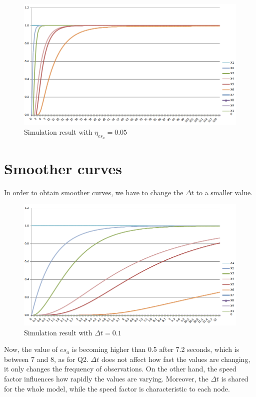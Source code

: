 \documentclass[a4paper]{article}
\begin{document}
\begin{figure}[!htpb]
\center
\includegraphics[width=\textwidth]{res/img/results_speed_factor}
\caption{Simulation result with $\eta_{es_{a}} = 0.05$}
\label{fig:simulation_result_speed_factor}
\end{figure}

\section{Smoother curves}

In order to obtain smoother curves, we have to change the $\Delta t$ to a smaller value.

\begin{figure}[!htpb]
\center
\includegraphics[width=\textwidth]{res/img/results_delta_t}
\caption{Simulation result with $\Delta t = 0.1$}
\label{fig:simulation_result_delta_t}
\end{figure}

Now, the value of $es_{a}$ is becoming higher than 0.5 after 7.2 seconds, which is between 7 and 8, as for Q2.
$\Delta t$ does not affect how fast the values are changing, it only changes the frequency of observations. On the other hand, the speed factor influences how rapidly the values are varying. Moreover, the $\Delta t$ is shared for the whole model, while the speed factor is characteristic to each node.
\end{document}
